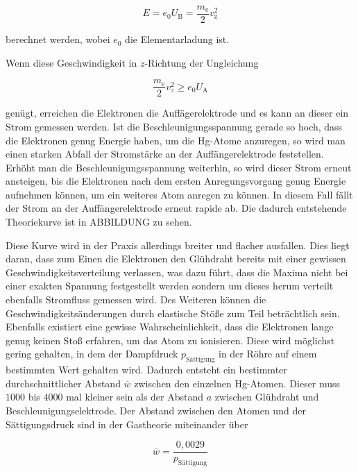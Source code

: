 \begin{equation}
    \label{eqn:eU}
    E = e_0 U_\text{B} = \frac{m_\text{e}}{2} v_\text{z}^2
\end{equation}

berechnet werden, wobei $e_0$ die Elementarladung ist.

Wenn diese Geschwindigkeit in $z$-Richtung der Ungleichung

\begin{equation}
    \label{eqn:min-vel}
    \frac{m_\text{e}}{2} v_z^2 \geq e_0 U_\text{A}
\end{equation}

genügt, erreichen die Elektronen die Auffägerelektrode und es kann an dieser ein Strom gemessen werden.
Ist die Beschleunigungsspannung gerade so hoch, dass die Elektronen genug Energie haben, um die Hg-Atome anzuregen, so wird man einen starken Abfall der Stromstärke an der Auffängerelektrode feststellen.
Erhöht man die Beschleunigungsspannung weiterhin, so wird dieser Strom erneut ansteigen, bis die Elektronen nach dem ersten Anregungsvorgang genug Energie aufnehmen können, um ein weiteres Atom anregen zu können.
In diesem Fall fällt der Strom an der Auffängerelektrode erneut rapide ab.
Die dadurch entstehende Theoriekurve ist in ABBILDUNG zu sehen.

Diese Kurve wird in der Praxis allerdings breiter und flacher ausfallen.
Dies liegt daran, dass zum Einen die Elektronen den Glühdraht bereits mit einer gewissen Geschwindigkeitsverteilung verlassen, was dazu führt, dass die Maxima nicht bei einer exakten Spannung festgestellt werden sondern um dieses herum verteilt ebenfalls Stromfluss gemessen wird.
Des Weiteren können die Geschwindigkeitsänderungen durch elastische Stöße zum Teil beträchtlich sein.
Ebenfalls existiert eine gewisse Wahrscheinlichkeit, dass die Elektronen lange genug keinen Stoß erfahren, um das Atom zu ionisieren.
Diese wird möglichst gering gehalten, in dem der Dampfdruck $p_\text{Sättigung}$ in der Röhre auf einem bestimmten Wert gehalten wird. Dadurch entsteht ein bestimmter durchschnittlicher Abstand $\overline{w}$ zwischen den einzelnen Hg-Atomen.
Dieser muss $1000$ bis $4000$ mal kleiner sein als der Abstand $a$ zwischen Glühdraht und Beschleunigungselektrode. Der Abstand zwischen den Atomen und der Sättigungsdruck sind in der Gastheorie miteinander über

\begin{equation}
    \label{eqn:druck-abstand}
    \overline{w} = \frac{0,0029}{p_\text{Sättigung}}
\end{equation}

